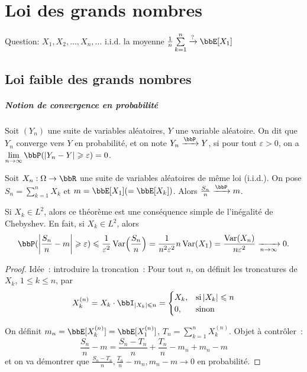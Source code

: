 \chapter{Loi des grands nombres}

Question: $X_1, X_2, \ldots, X_n, \ldots$ i.i.d.
la moyenne $\frac{1}{n} \sum\limits_{k = 1}^n \xrightarrow[]{?} \bbE[X_1]$

\section{Loi faible des grands nombres}

\paragraph{Notion de convergence en probabilité}

\begin{deff}
    Soit $(Y_n)$ une suite de variables aléatoires, $Y$ une variable aléatoire.
    On dit que $Y_n$ converge vers $Y$ en probabilité, et on note $Y_n \xrightarrow[]{\bbP} Y$,
    si pour tout $\varepsilon > 0$, on a $\lim\limits_{n \to \infty} \bbP(\lrvert{Y_n - Y} \geqslant \varepsilon) = 0$.
\end{deff}

\begin{thm}
    Soit $X_n: \Omega \to \bbR$ une suite de variables aléatoires de même loi (i.i.d.).
    On pose $S_n = \sum\limits_{k = 1}^n X_k$ et $m = \bbE[X_1] (= \bbE[X_k])$.
    Alors $\frac{S_n}{n} \xrightarrow[]{\bbP} m$.
\end{thm}

\begin{rqq}
    Si $X_k \in L^2$, alors ce théorème est une conséquence simple de l'inégalité de Chebyshev.
    En fait, si $X_k \in L^2$, alors
    \[ \bbP(\lrvert{\frac{S_n}{n} - m} \geqslant \varepsilon) \leqslant \frac{1}{\varepsilon^2} \var\Bigl(\frac{S_n}{n}\Bigr)
        = \frac{1}{n^2 \varepsilon^2} n \var(X_1) = \frac{\var(X_n)}{n \varepsilon^2} \xrightarrow[n \to \infty]{} 0. \]
\end{rqq}

\begin{proof}
    Idée~: introduire la troncation~:
    Pour tout $n$, on définit les troncatures de $X_k$, $1 \leqslant k \leqslant n$, par
    \[ X_k^{(n)} = X_k \cdot \bbI_{\lrvert{X_k} \leqslant n} =
        \begin{cases}
            X_k, & \text{si} \lrvert{X_k} \leqslant n \\
            0,   & \text{sinon}
        \end{cases}
    \]

    On définit $m_n = \bbE[X_k^{(n)}] = \bbE[X_1^{(n)}]$, $T_n = \sum\limits_{k = 1}^n X_k^{(n)}$.
    Objet à contrôler~:
    \[ \frac{S_n}{n} - m = \frac{S_n - T_n}{n} + \frac{T_n}{n} - m_n + m_n - m \]
    et on va démontrer que $\frac{S_n - T_n}{n}, \frac{T_n}{n} - m_n, m_n - m \to 0$ en probabilité.
\end{proof}

